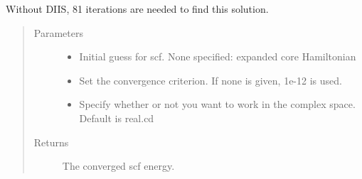 \documentclass[letterpaper,10pt,english]{sphinxmanual}
\begin{document}
\begin{fulllineitems}
\begin{fulllineitems}
\begin{sphinxVerbatim}[commandchars=\\\{\}]
          
   
  
\end{sphinxVerbatim}

Without DIIS, 81 iterations are needed to find this solution.
\begin{quote}\begin{description}
\item[{Parameters}] \leavevmode\begin{itemize}
\item {} 
 \textendash{} Initial guess for scf. None specified: expanded core Hamiltonian

\item {} 
 \textendash{} Set the convergence criterion. If none is given, 1e-12 is used.

\item {} 
 \textendash{} Specify whether or not you want to work in the complex space. Default is real.cd

\end{itemize}

\item[{Returns}] \leavevmode
The converged scf energy.

\end{description}\end{quote}

\end{fulllineitems}


\end{fulllineitems}
\end{document}
